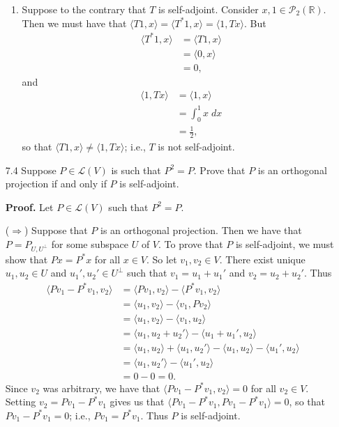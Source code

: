 \documentclass[9pt]{article}
\newcommand{\R}{\mathbb{R}}
\newcommand{\cyc}[1]{\langle #1 \rangle}
\begin{document}
\begin{enumerate}
      \begin{enumerate}
         \item Suppose to the contrary that $T$ is self-adjoint. Consider
               $x, 1 \in \mathcal{P}_2(\R)$. Then we must have that
               $\cyc{T1, x} = \cyc{T^*1, x} = \cyc{1, Tx}$. But
               \begin{align*}
                  \cyc{T^*1, x} &= \cyc{T1, x} \\
                                 &= \cyc{0, x} \\
                                 &= 0,
               \end{align*}
               and
               \begin{align*}
                  \cyc{1, Tx} &= \cyc{1, x} \\
                                &= \int_0^1 x\;dx \\
                                &= \frac{1}{2},
               \end{align*}
               so that $\cyc{T1, x} \neq  \cyc{1, Tx}$; i.e., $T$ is not
               self-adjoint.
      \end{enumerate}
   \item[7.4]  Suppose $P \in \mathcal{L}(V)$ is such that $P^2 = P$. Prove that
               $P$ is an orthogonal projection if and only if $P$ is
               self-adjoint.

      \textbf{Proof.} Let $P \in \mathcal{L}(V)$ such that $P^2 = P$.

      ($\Longrightarrow$) Suppose that $P$ is an orthogonal projection. Then we
      have that $P = P_{U,U^\perp}$ for some subspace $U$ of $V$. To prove that
      $P$ is self-adjoint, we must show that $Px = P^*x$ for all $x \in V$. So
      let $v_1, v_2 \in V$. There exist unique $u_1, u_2 \in U$ and
      $u_1', u_2' \in U^\perp$ such that $v_1 = u_1 + u_1'$ and
      $v_2 = u_2 + u_2'$. Thus
      \begin{align*}
         \cyc{Pv_1 - P^*v_1, v_2} &= \cyc{Pv_1, v_2} - \cyc{P^*v_1, v_2} \\
            &= \cyc{u_1, v_2} - \cyc{v_1, Pv_2} \\
            &= \cyc{u_1, v_2} - \cyc{v_1, u_2} \\
            &= \cyc{u_1, u_2 + u_2'} - \cyc{u_1 + u_1', u_2} \\
            &= \cyc{u_1, u_2} + \cyc{u_1, u_2'} -
               \cyc{u_1, u_2} - \cyc{u_1', u_2} \\
            &= \cyc{u_1, u_2'} - \cyc{u_1', u_2} \\
            &= 0 - 0 = 0.
      \end{align*}
      Since $v_2$ was arbitrary, we have that $\cyc{Pv_1 - P^*v_1, v_2} = 0$
      for all $v_2 \in V$. Setting $v_2 = Pv_1 - P^*v_1$ gives us that
      $\cyc{Pv_1 - P^*v_1, Pv_1 - P^*v_1} = 0$, so that $Pv_1 - P^*v_1 = 0$;
      i.e., $Pv_1 = P^*v_1$. Thus $P$ is self-adjoint.


\end{enumerate}
\end{document}
